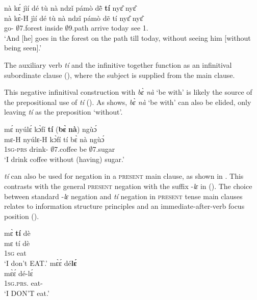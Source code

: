 \ea\label{NEGinf2}
  \glll    nà kɛ́ jìí dé tù nà ndzǐ pámò dẽ̂ {\bfseries tí} nyɛ̂ nyɛ̂ \\
          nà kɛ̀-H jìí dé tù nà ndzǐ pámò dẽ  tí nyɛ̂ nyɛ̂ \\
         {\COM} go-{\R} $\emptyset$7.forest {\LOC} inside {\COM} $\emptyset$9.path arrive today {\NEG} see 1.{\OBJ}\\
    \trans `And [he] goes in the forest on the path till today, without seeing him [without being seen].'
\z

\noindent The auxiliary verb {\itshape tí} and the infinitive together function as an infinitival subordinate clause (), where the subject is supplied from the main clause. 

This negative infinitival construction with {\itshape bɛ̀ nà} `be with'  is likely the source of the prepositional use of {\itshape tí} (). As  shows, {\itshape bɛ̀ nà} `be with' can also be elided, only leaving {\itshape tí} as the preposition `without'.

\ea\label{NEGinf1x}
  \glll  mɛ́ nyúlɛ́ kɔ̀fí {\bfseries tí} ({\bfseries bɛ̀} {\bfseries nà}) ngùɔ́ \\
            mɛ-H nyúlɛ-H kɔ̀fí tí bɛ̀ nà ngùɔ́ \\
         1\textsc{sg}-\textsc{prs} drink-{\R} $\emptyset$7.coffee {\NEG} be {\COM} $\emptyset$7.sugar\\
    \trans `I drink coffee without (having) sugar.'
\z






{\itshape tí} can also be used for negation in a \textsc{present} main clause, as shown in . This contrasts with the general \textsc{present} negation with the suffix -{\itshape lɛ} in  ().
The choice between standard -{\itshape lɛ} negation and {\itshape tí} negation in \textsc{present} tense main clauses relates to information structure principles and an immediate-after-verb focus position ().

\ea\label{tile}
\ea \label{tilea}
  \glll  mɛ̀ {\bfseries tí} dè\\
         mɛ tí dè \\
           1\textsc{sg} {\NEG}  eat\\
    \trans `I don't EAT.'
\ex \label{tileb}
  \glll  mɛ̀ɛ́ dé{\bfseries lɛ́} \\
        mɛ̀ɛ́ dé-lɛ́ \\
         1\textsc{sg}.\textsc{prs}.{\NEG} eat-{\NEG}    \\
    \trans `I DON'T eat.'
\z
\z

